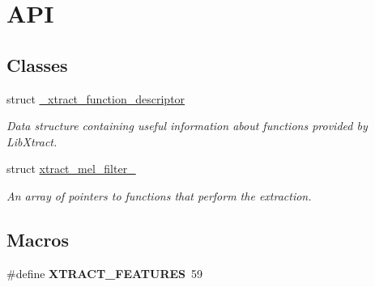 \hypertarget{group__libxtract}{\section{A\-P\-I}
\label{group__libxtract}
}
\subsection*{Classes}
\begin{DoxyCompactItemize}
\item 
struct \hyperlink{struct__xtract__function__descriptor}{\-\_\-xtract\-\_\-function\-\_\-descriptor}
\begin{DoxyCompactList}\small\item\em Data structure containing useful information about functions provided by Lib\-Xtract. \end{DoxyCompactList}\item 
struct \hyperlink{structxtract__mel__filter__}{xtract\-\_\-mel\-\_\-filter\-\_\-}
\begin{DoxyCompactList}\small\item\em An array of pointers to functions that perform the extraction. \end{DoxyCompactList}\end{DoxyCompactItemize}
\subsection*{Macros}
\begin{DoxyCompactItemize}
\item 
\hypertarget{group__libxtract_ga44a0189b2c9eb3dc0bc359aeb206b9c3}{\#define {\bfseries X\-T\-R\-A\-C\-T\-\_\-\-F\-E\-A\-T\-U\-R\-E\-S}~59}\label{group__libxtract_ga44a0189b2c9eb3dc0bc359aeb206b9c3}

\end{DoxyCompactItemize}
